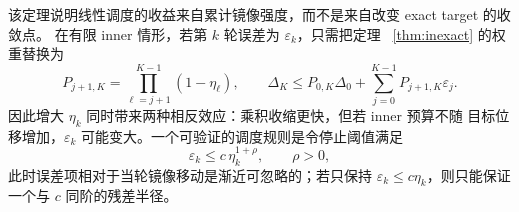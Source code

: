 该定理说明线性调度的收益来自累计镜像强度，而不是来自改变 exact target 的收敛点。
在有限 inner 情形，若第 $k$ 轮误差为 $\varepsilon_k$，只需把定理
~\ref{thm:inexact} 的权重替换为
\[
 P_{j+1,K}=\prod_{\ell=j+1}^{K-1}(1-\eta_\ell),
 \qquad
 \Delta_K\le P_{0,K}\Delta_0+\sum_{j=0}^{K-1}P_{j+1,K}\varepsilon_j.
\]
因此增大 $\eta_k$ 同时带来两种相反效应：乘积收缩更快，但若 inner 预算不随
目标位移增加，$\varepsilon_k$ 可能变大。一个可验证的调度规则是令停止阈值满足
\[
 \varepsilon_k\le c\,\eta_k^{1+\rho},\qquad \rho>0,
\]
此时误差项相对于当轮镜像移动是渐近可忽略的；若只保持
$\varepsilon_k\le c\eta_k$，则只能保证一个与 $c$ 同阶的残差半径。
